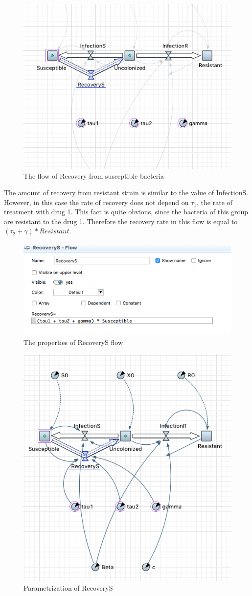\begin{figure}[H]
  \centering
  \includegraphics[height=0.5\textwidth]{img/screens/recovery/recovery6}
  \caption{The flow of Recovery from susceptible bacteria}
\end{figure}

The amount of recovery from resistant strain is similar to the value of InfectionS. However, in this case the rate of recovery does not depend on $\tau_1$, the rate of treatment with drug 1. This fact is quite obvious, since the bacteria of this group are resistant to the drug 1. Therefore the recovery rate in this flow is equal to $(\tau_2 + \gamma) * Resistant$.

\begin{figure}[H]
  \centering
  \includegraphics[height=0.3\textwidth]{img/screens/recovery/recovery5}
  \caption{The properties of RecoveryS flow}
\end{figure}

\begin{figure}[H]
  \centering
  \includegraphics[height=0.6\textwidth]{img/screens/recovery/recovery7}
  \caption{Parametrization of RecoveryS}
\end{figure}

